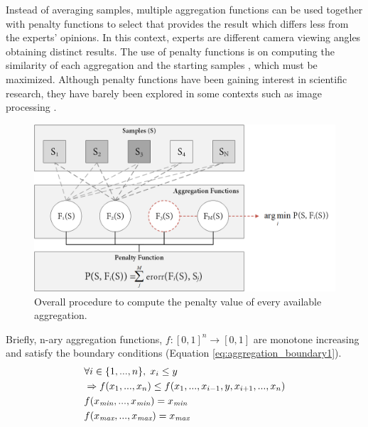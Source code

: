 Instead of averaging samples, multiple aggregation functions can be used together with penalty functions to select that provides the result which differs less from the experts' opinions. In this context, experts are different camera viewing angles obtaining distinct results. The use of penalty functions is on computing the similarity of each aggregation and the starting samples \cite{bustince_definition_2017, bustince_penalty_2017}, which must be maximized. Although penalty functions have been gaining interest in scientific research, they have barely been explored in some contexts such as image processing \cite{paternain_color_2012}. 

\begin{figure}[!ht]
	\includegraphics[width=\linewidth]{figs/fundamentals/penalty_functions.png}
	\caption{Overall procedure to compute the penalty value of every available aggregation.}
	\label{fig:penalty_funtions}
\end{figure}
Briefly, n-ary aggregation functions, $f: [0, 1]^n \rightarrow [0, 1]$ are monotone increasing and satisfy the boundary conditions (Equation \ref{eq:aggregation_boundary1}).  
\begin{gather}
    \begin{aligned}
        &\forall i \in \{1,...,n\}, \hspace{1mm} x_i \leq y\\
        &\Rightarrow f(x_1,...,x_n) \leq f(x_1,..., x_{i-1}, y, x_{i+1},...,x_n)\\
        &f(x_{\textit{min}},...,x_{\textit{min}}) = x_{\textit{min}}\\
        &f(x_{\textit{max}},...,x_{\textit{max}}) = x_{\textit{max}}
    \end{aligned}
    \label{eq:aggregation_boundary1}
\end{gather}

